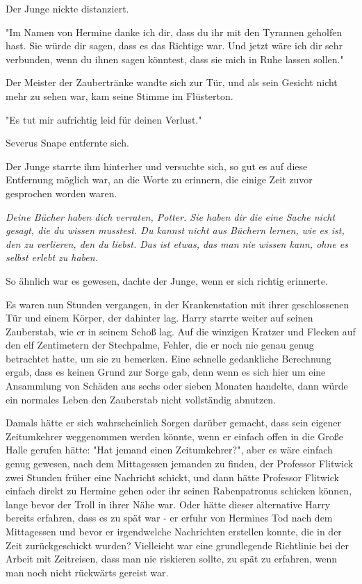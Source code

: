 {Der Junge nickte distanziert.

"Im Namen von Hermine danke ich dir, dass du ihr mit den Tyrannen geholfen hast. Sie würde dir sagen, dass es das Richtige war. Und jetzt wäre ich dir sehr verbunden, wenn du ihnen sagen könntest, dass sie mich in Ruhe lassen sollen."

Der Meister der Zaubertränke wandte sich zur Tür, und als sein Gesicht nicht mehr zu sehen war, kam seine Stimme im Flüsterton.

"Es tut mir aufrichtig leid für deinen Verlust."

Severus Snape entfernte sich.

Der Junge starrte ihm hinterher und versuchte sich, so gut es auf diese Entfernung möglich war, an die Worte zu erinnern, die einige Zeit zuvor gesprochen worden waren.

\emph{Deine Bücher haben dich verraten, Potter. Sie haben dir die eine Sache nicht gesagt, die du wissen musstest. Du kannst nicht aus Büchern lernen, wie es ist, den zu verlieren, den du liebst. Das ist etwas, das man nie wissen kann, ohne es selbst erlebt zu haben.}

So ähnlich war es gewesen, dachte der Junge, wenn er sich richtig erinnerte.

Es waren nun Stunden vergangen, in der Krankenstation mit ihrer geschlossenen Tür und einem Körper, der dahinter lag. Harry starrte weiter auf seinen Zauberstab, wie er in seinem Schoß lag. Auf die winzigen Kratzer und Flecken auf den elf Zentimetern der Stechpalme, Fehler, die er noch nie genau genug betrachtet hatte, um sie zu bemerken. Eine schnelle gedankliche Berechnung ergab, dass es keinen Grund zur Sorge gab, denn wenn es sich hier um eine Ansammlung von Schäden aus sechs oder sieben Monaten handelte, dann würde ein normales Leben den Zauberstab nicht vollständig abnutzen.

Damals hätte er sich wahrscheinlich Sorgen darüber gemacht, dass sein eigener Zeitumkehrer weggenommen werden könnte, wenn er einfach offen in die Große Halle gerufen hätte: "Hat jemand einen Zeitumkehrer?", aber es wäre einfach genug gewesen, nach dem Mittagessen jemanden zu finden, der Professor Flitwick zwei Stunden früher eine Nachricht schickt, und dann hätte Professor Flitwick einfach direkt zu Hermine gehen oder ihr seinen Rabenpatronus schicken können, lange bevor der Troll in ihrer Nähe war. Oder hätte dieser alternative Harry bereits erfahren, dass es zu spät war - er erfuhr von Hermines Tod nach dem Mittagessen und bevor er irgendwelche Nachrichten erstellen konnte, die in der Zeit zurückgeschickt wurden? Vielleicht war eine grundlegende Richtlinie bei der Arbeit mit Zeitreisen, dass man nie riskieren sollte, zu spät zu erfahren, wenn man noch nicht rückwärts gereist war.

}
